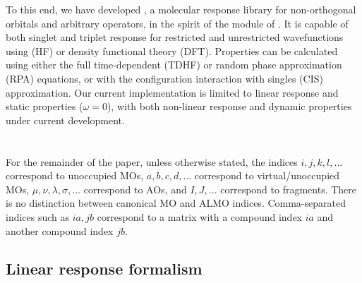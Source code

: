 \documentclass[%
  class = book,%
  crop = false,%
  float = true,%
  multi = true,%
  preview = false,%
]{standalone}
\begin{document}
To this end, we have developed \libresponse{}, a molecular response library for non-orthogonal orbitals and arbitrary operators, in the spirit of the \response{} module of \pdalton{}\cite{daltonpaper}. It is capable of both singlet\cite{doi:10.1063/1.454885} and triplet\cite{doi:10.1063/1.457471} response for restricted and unrestricted wavefunctions using \hf{} (HF) or density functional theory (DFT). Properties can be calculated using either the full time-dependent \hf{} (TDHF) or random phase approximation (RPA) equations, or with the configuration interaction with singles (CIS) approximation\cite{doi:10.1021/j100180a030}. Our current implementation is limited to linear response and static properties (\(\omega = 0\)), with both non-linear response and dynamic properties under current development.

\section{\texorpdfstring{}{Theory}}
\label{sec:theory}

For the remainder of the paper, unless otherwise stated, the indices \(i,j,k,l,...\) correspond to unoccupied MOs, \(a,b,c,d,...\) correspond to virtual/unoccupied MOs, \(\mu,\nu,\lambda,\sigma,...\) correspond to AOs, and \(I,J,...\) correspond to fragments. There is no distinction between canonical MO and ALMO indices. Comma-separated indices such as \(ia,jb\) correspond to a matrix with a compound index \(ia\) and another compound index \(jb\).

\subsection{Linear response formalism}
\label{ssec:linear-response-formalism}
\end{document}

